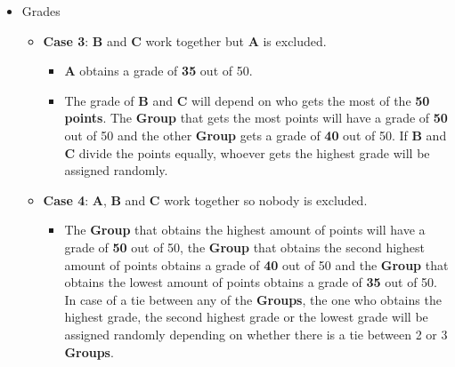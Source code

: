 \documentclass[
  ignorenonframetext,
]{beamer}
\providecommand{\tightlist}{%
  \setlength{\itemsep}{0pt}\setlength{\parskip}{0pt}}\usepackage{longtable,booktabs,array}
\begin{document}
\begin{frame}{}
\label{section-8}
\begin{itemize}
\item
  Grades

  \begin{itemize}
  \item
    \textbf{Case 3}: \textbf{B} and \textbf{C} work together but
    \textbf{A} is excluded.

    \begin{itemize}
    \tightlist
    \item
      \textbf{A} obtains a grade of \textbf{35} out of 50.
    \item
      The grade of \textbf{B} and \textbf{C} will depend on who gets the
      most of the \textbf{50 points}. The \textbf{Group} that gets the
      most points will have a grade of \textbf{50} out of 50 and the
      other \textbf{Group} gets a grade of \textbf{40} out of 50. If
      \textbf{B} and \textbf{C} divide the points equally, whoever gets
      the highest grade will be assigned randomly.
    \end{itemize}
  \item
    \textbf{Case 4}: \textbf{A}, \textbf{B} and \textbf{C} work together
    so nobody is excluded.

    \begin{itemize}
    \tightlist
    \item
      The \textbf{Group} that obtains the highest amount of points will
      have a grade of \textbf{50} out of 50, the \textbf{Group} that
      obtains the second highest amount of points obtains a grade of
      \textbf{40} out of 50 and the \textbf{Group} that obtains the
      lowest amount of points obtains a grade of \textbf{35} out of 50.
      In case of a tie between any of the \textbf{Groups}, the one who
      obtains the highest grade, the second highest grade or the lowest
      grade will be assigned randomly depending on whether there is a
      tie between 2 or 3 \textbf{Groups}.
    \end{itemize}
  \end{itemize}
\end{itemize}
\end{frame}
\end{document}
